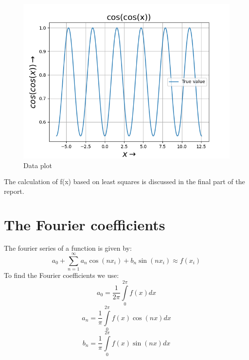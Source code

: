\documentclass[11pt, a4paper]{article}
\begin{document}
   \begin{figure}[!tbh]
   	\centering
   	\includegraphics[scale=0.6]{Figure_2a.png}   
   	\caption{Data plot}
   	\label{fig:sample}
   \end{figure}
   
The calculation of f(x) based on least squares is discussed in the final part of the report.
\newpage
\section{The Fourier coefficients}
The fourier series of a function is given by:
\begin{equation}
    a_{0} + \sum\limits_{n=1}^{\infty} {{a_{n}\cos(nx_{i})+b_{n}\sin(nx_{i})}} \approx f(x_{i}) 
    \end{equation}
    	To find the Fourier coefficients we use:
    \begin{equation}
         a_{0} = \frac{1}{2\pi}\int\limits_{0}^{2\pi} f(x)dx 
    \end{equation}
    \begin{equation}
         a_{n} = \frac{1}{\pi}\int\limits_{0}^{2\pi} f(x)\cos(nx)dx 
    \end{equation}
    \begin{equation}
         b_{n} = \frac{1}{\pi}\int\limits_{0}^{2\pi} f(x)\sin(nx)dx 
    \end{equation}
\end{document}
